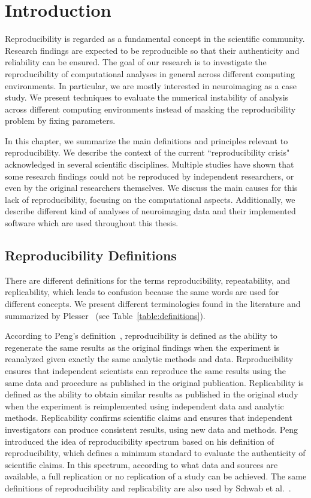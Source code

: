 \chapter{Introduction}
\label{ch:intro}

Reproducibility is regarded as a fundamental concept in the scientific 
community. Research findings are expected to be reproducible so that 
their authenticity and reliability can be ensured. The goal of our
research is to investigate the reproducibility of computational analyses in general across different 
computing environments. In particular, we are mostly interested in 
neuroimaging as a case study. We present techniques to evaluate 
the numerical instability of analysis across different computing environments 
instead of masking the reproducibility problem by fixing parameters.

In this chapter, we summarize the main definitions and 
principles relevant to reproducibility. We describe the context of the 
current ``reproducibility crisis" acknowledged in several scientific 
disciplines. Multiple studies have shown that some research findings could 
not be reproduced by independent researchers, or even by the original 
researchers themselves. We discuss the main causes for this lack of 
reproducibility, focusing on the computational aspects. 
Additionally, we describe different kind of analyses of 
neuroimaging data and their implemented software which are used
throughout this thesis. 

\section{Reproducibility Definitions}

There are different definitions for the terms reproducibility, 
repeatability, and replicability, which leads to confusion because the 
same words are used for different concepts. We present different 
terminologies found in the literature and summarized 
by Plesser~\cite{plesser2018reproducibility} (see 
Table~\ref{table:definitions}).
 
According to Peng's definition~\cite{peng2011reproducible}, 
reproducibility is defined as the ability to regenerate the same 
results as the original findings when the experiment is reanalyzed 
given exactly the same analytic methods and data. Reproducibility 
ensures that independent scientists can reproduce the same results 
using the same data and procedure as published in the original 
publication. Replicability is defined as the ability 
to obtain similar results as published in the original study when 
the experiment is reimplemented using independent data and analytic 
methods. Replicability confirms scientific claims and ensures that 
independent investigators can produce consistent results, using new 
data and methods. Peng introduced the idea of reproducibility 
spectrum based on his definition of reproducibility, which defines a 
minimum standard to evaluate the authenticity of scientific claims. 
In this spectrum, according to what data and sources are available, a 
full replication or no replication of a study can be achieved. 
The same definitions of reproducibility and replicability 
are also used by Schwab et al.~\cite{schwab2000making}.

